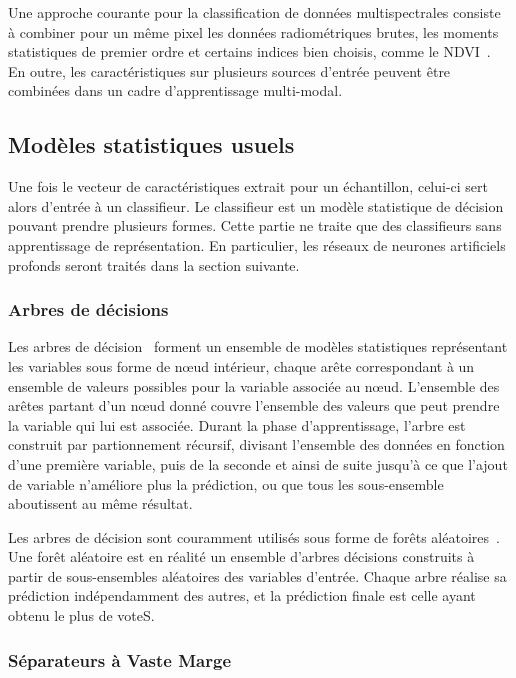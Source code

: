 Une approche courante pour la classification de données multispectrales consiste à combiner pour un même pixel les données radiométriques brutes, les moments statistiques de premier ordre et certains indices bien choisis, comme le NDVI~\cite{dechesne_semantic_2017}. En outre, les caractéristiques sur plusieurs sources d'entrée peuvent être combinées dans un cadre d'apprentissage multi-modal.

\subsection{Modèles statistiques usuels}

Une fois le vecteur de caractéristiques extrait pour un échantillon, celui-ci sert alors d'entrée à un classifieur. Le classifieur est un modèle statistique de décision pouvant prendre plusieurs formes. Cette partie ne traite que des classifieurs sans apprentissage de représentation. En particulier, les réseaux de neurones artificiels profonds seront traités dans la section suivante.

\subsubsection{Arbres de décisions}

Les arbres de décision~\cite{breiman_classification_2017} forment un ensemble de modèles statistiques représentant les variables sous forme de n\oe{}ud intérieur, chaque arête correspondant à un ensemble de valeurs possibles pour la variable associée au n\oe{}ud. L'ensemble des arêtes partant d'un n\oe{}ud donné couvre l'ensemble des valeurs que peut prendre la variable qui lui est associée. Durant la phase d'apprentissage, l'arbre est construit par partionnement récursif, divisant l'ensemble des données en fonction d'une première variable, puis de la seconde et ainsi de suite jusqu'à ce que l'ajout de variable n'améliore plus la prédiction, ou que tous les sous-ensemble aboutissent au même résultat.

Les arbres de décision sont couramment utilisés sous forme de forêts aléatoires~\cite{breiman_random_2001}. Une forêt aléatoire est en réalité un ensemble d'arbres décisions construits à partir de sous-ensembles aléatoires des variables d'entrée. Chaque arbre réalise sa prédiction indépendamment des autres, et la prédiction finale est celle ayant obtenu le plus de voteS.


\subsubsection{Séparateurs à Vaste Marge}


